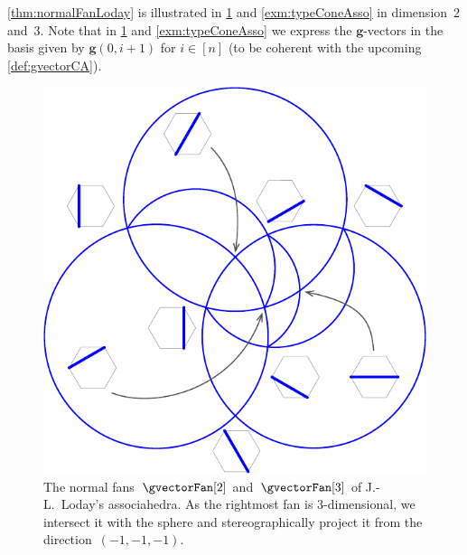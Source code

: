 \documentclass{amsart}
\theoremstyle{definition}
\renewcommand{\b}[1]{{\boldsymbol{#1}}} %
\newcommand{\gvector}[1]{\b{g}(#1)} %
\begin{document}
\cref{thm:normalFanLoday} is illustrated in \cref{fig:lodayFans} and \cref{exm:typeConeAsso} in dimension~$2$ and~$3$.
Note that in \cref{fig:lodayFans} and \cref{exm:typeConeAsso} we express the $\b{g}$-vectors in the basis given by $\gvector{0,i+1}$ for $i\in [n]$ (to be coherent with the upcoming \cref{def:gvectorCA}).

\begin{figure}
	\capstart
	\centerline{\hspace{1.5cm}\includegraphics[scale=.45]{lodayFan3}}
	\caption{The normal fans~$\gvectorFan[2]$ and~$\gvectorFan[3]$ of J.-L.~Loday's associahedra. As the rightmost fan is $3$-dimensional, we intersect it with the sphere and stereographically project it from the direction~$(-1,-1,-1)$.}
	\label{fig:lodayFans}
\end{figure}
\end{document}
